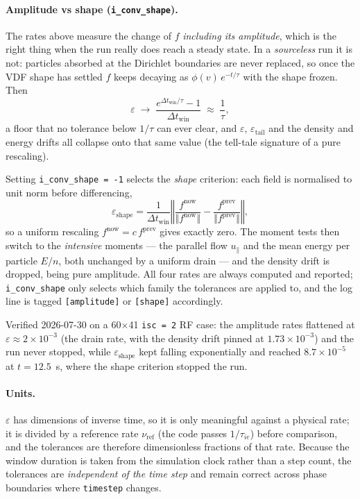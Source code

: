 \documentclass[11pt,a4paper]{article}
\begin{document}
\paragraph{Amplitude vs shape (\texttt{i\_conv\_shape}).}  The rates above measure
the change of $f$ \emph{including its amplitude}, which is the right thing when the
run really does reach a steady state.  In a \emph{sourceless} run it is not: particles
absorbed at the Dirichlet boundaries are never replaced, so once the VDF shape has
settled $f$ keeps decaying as $\phi(v)\,e^{-t/\tau}$ with the shape frozen.  Then
\begin{equation}
  \varepsilon \;\longrightarrow\; \frac{e^{\Delta t_\mathrm{win}/\tau}-1}
                                       {\Delta t_\mathrm{win}} \;\approx\; \frac{1}{\tau},
\end{equation}
a floor that no tolerance below $1/\tau$ can ever clear, and $\varepsilon$,
$\varepsilon_\mathrm{tail}$ and the density and energy drifts all collapse onto that
same value (the tell-tale signature of a pure rescaling).

Setting \texttt{i\_conv\_shape = -1} selects the \emph{shape} criterion: each field is
normalised to unit norm before differencing,
\begin{equation}
  \varepsilon_\mathrm{shape} =
    \frac{1}{\Delta t_\mathrm{win}}
    \left\Vert \frac{f^\mathrm{now}}{\Vert f^\mathrm{now}\Vert}
             - \frac{f^\mathrm{prev}}{\Vert f^\mathrm{prev}\Vert} \right\Vert ,
  \label{eq:epsshape}
\end{equation}
so a uniform rescaling $f^\mathrm{now} = c\,f^\mathrm{prev}$ gives exactly zero.  The
moment tests then switch to the \emph{intensive} moments --- the parallel flow
$u_\parallel$ and the mean energy per particle $E/n$, both unchanged by a uniform
drain --- and the density drift is dropped, being pure amplitude.  All four rates are
always computed and reported; \texttt{i\_conv\_shape} only selects which family the
tolerances are applied to, and the log line is tagged \texttt{[amplitude]} or
\texttt{[shape]} accordingly.

Verified 2026-07-30 on a 60$\times$41 \texttt{isc = 2} RF case: the amplitude rates
flattened at $\varepsilon \approx 2\times10^{-3}$ (the drain rate, with the density
drift pinned at $1.73\times10^{-3}$) and the run never stopped, while
$\varepsilon_\mathrm{shape}$ kept falling exponentially and reached
$8.7\times10^{-5}$ at $t = 12.5$~s, where the shape criterion stopped the run.

\paragraph{Units.}  $\varepsilon$ has dimensions of inverse time, so it is only
meaningful against a physical rate; it is divided by a reference rate
$\nu_\mathrm{ref}$ (the code passes $1/\tau_{ie}$) before comparison, and the
tolerances are therefore dimensionless fractions of that rate.  Because the
window duration is taken from the simulation clock rather than a step count, the
tolerances are \emph{independent of the time step} and remain correct across
phase boundaries where \texttt{timestep} changes.
\end{document}
